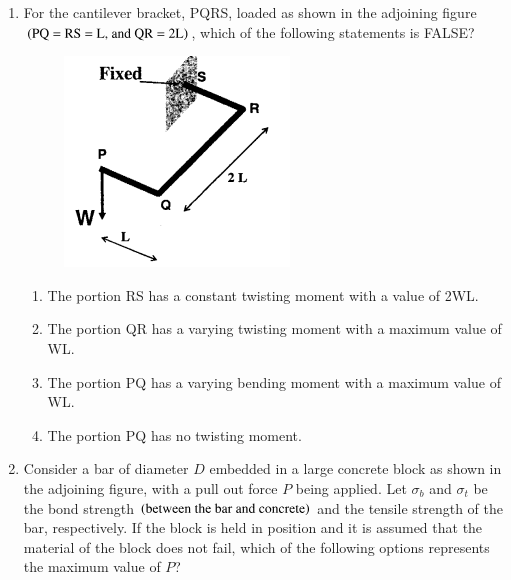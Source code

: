 \documentclass[journal,12pt,onecolumn]{IEEEtran}
\theoremstyle{remark}
\begin{document}
\begin{enumerate}
\item For the cantilever bracket, PQRS, loaded as shown in the adjoining figure $\left(\text{PQ = RS = L, and QR = 2L}\right)$, which of the following statements is FALSE?

\hfill{}
\begin{figure}[H]
\centering
\includegraphics[width=0.4\columnwidth]{figs/q32.png}
\caption*{}
\label{fig:Q.32}
\end{figure}
\begin{enumerate}
\item The portion RS has a constant twisting moment with a value of 2WL.
\item The portion QR has a varying twisting moment with a maximum value of WL.
\item The portion PQ has a varying bending moment with a maximum value of WL.
\item The portion PQ has no twisting moment.
\end{enumerate}

\item Consider a bar of diameter $D$ embedded in a large concrete block as shown in the adjoining figure, with a pull out force $P$ being applied. Let $\sigma_b$ and $\sigma_t$ be the bond strength $\left(\text{between the bar and concrete}\right)$ and the tensile strength of the bar, respectively. If the block is held in position and it is assumed that the material of the block does not fail, which of the following options represents the maximum value of $P$?


\end{enumerate}
\end{document}
